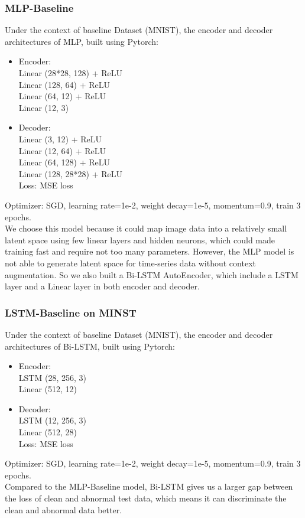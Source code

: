 \documentclass{article}
\begin{document}
\subsubsection{MLP-Baseline}
Under the context of baseline Dataset (MNIST), the encoder and decoder architectures of MLP, built using Pytorch: 
\begin{itemize}
\item Encoder: \\
Linear (28*28, 128) + ReLU \\
Linear (128, 64) + ReLU \\
Linear (64, 12) + ReLU \\
Linear (12, 3) \\
\item Decoder: \\
Linear (3, 12) + ReLU \\
Linear (12, 64) + ReLU \\
Linear (64, 128) + ReLU \\
Linear (128, 28*28) + ReLU \\
Loss: MSE loss \\
\end{itemize}
Optimizer: SGD, learning rate=1e-2, weight decay=1e-5, momentum=0.9, train 3 epochs.\\
We choose this model because it could map image data into a relatively small latent space using few linear layers and hidden neurons, which could made training fast and require not too many parameters. 
However, the MLP model is not able to generate latent space for time-series data without context augmentation. So we also built a Bi-LSTM AutoEncoder, which include a LSTM layer and a Linear layer in both encoder and decoder.  

\subsubsection{LSTM-Baseline on MINST}
Under the context of baseline Dataset (MNIST), the encoder and decoder architectures of Bi-LSTM, built using Pytorch: 
\begin{itemize}
\item Encoder: \\
LSTM (28, 256, 3)  \\
Linear (512, 12) \\
\item Decoder: \\
LSTM (12, 256, 3)  \\
Linear (512, 28) \\
Loss: MSE loss \\
\end{itemize}
Optimizer: SGD, learning rate=1e-2, weight decay=1e-5, momentum=0.9, train 3 epochs.\\
Compared to the MLP-Baseline model, Bi-LSTM gives us a larger gap between the loss of clean and abnormal test data, which means it can discriminate the clean and abnormal data better.
\end{document}
